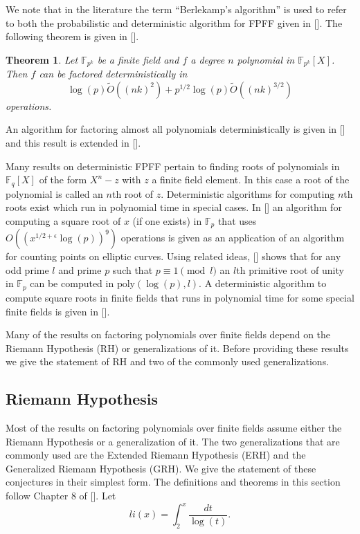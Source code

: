 \documentclass{article}
\newcounter{dummy} \numberwithin{dummy}{section}
\theoremstyle{plain}
\newtheorem{thm}[dummy]{Theorem}
\theoremstyle{definition}
\def\Fp {{ \mathbb{F} _ {p} }}
\def\Fq {{ \mathbb{F} _ {q} }}
\def\poly {{ \mathrm{poly} }}
\begin{document}
				We note that in the literature the term ``Berlekamp's algorithm'' is used to refer to both the probabilistic and deterministic algorithm for FPFF given in []. The following theorem is given in [].
				\begin{thm}
				\label{THM:DETERMFAC}
				    Let $\mathbb{F}_{p^k}$ be a finite field and $f$ a degree $n$ polynomial in $\mathbb{F}_{p^k}[X]$. Then $f$ can be factored deterministically in 
						     \[ \log(p)\tilde{O}((nk)^2) + p^{1 / 2} \log(p) \tilde{O}((nk)^{3/2}) \] 
						operations. 
				\end{thm}
				
				An algorithm for factoring almost all polynomials deterministically is given in [] and this result is extended in []. 

		    Many results on deterministic FPFF pertain to finding roots of polynomials in $\Fq[X]$ of the form $X^n - z$ with $z$ a finite field element. In this case a root of the polynomial is called an $n$th root of $z$. Deterministic algorithms for computing $n$th roots exist which run in polynomial time in special cases. In [] an algorithm for computing a square root of $x$ (if one exists) in $\Fp$ that uses $O((x^{1/2 + \epsilon} \log(p) )^9)$ operations is given as an application of an algorithm for counting points on elliptic curves. Using related ideas, [] shows that for any odd prime $l$ and prime $p$ such that $p \equiv 1 \pmod{l}$ an $l$th primitive root of unity in $\Fp$ can be computed in $\poly(\log(p), l)$. A deterministic algorithm to compute square roots in finite fields that runs in polynomial time for some special finite fields is given in [].

	      Many of the results on factoring polynomials over finite fields depend on the Riemann Hypothesis (RH) or generalizations of it. Before providing these results we give the statement of RH and two of the commonly used generalizations. 		
		\subsection{Riemann Hypothesis}
	
				Most of the results on factoring polynomials over finite fields assume either the Riemann Hypothesis or a generalization of it. The two generalizations that are commonly used are the Extended Riemann Hypothesis (ERH) and the Generalized Riemann Hypothesis (GRH). We give the statement of these conjectures in their simplest form. The definitions and theorems in this section follow Chapter 8 of []. Let
				\[li(x)=\int_{2}^x{\frac {dt}{\log(t)}}. \]
\end{document}

